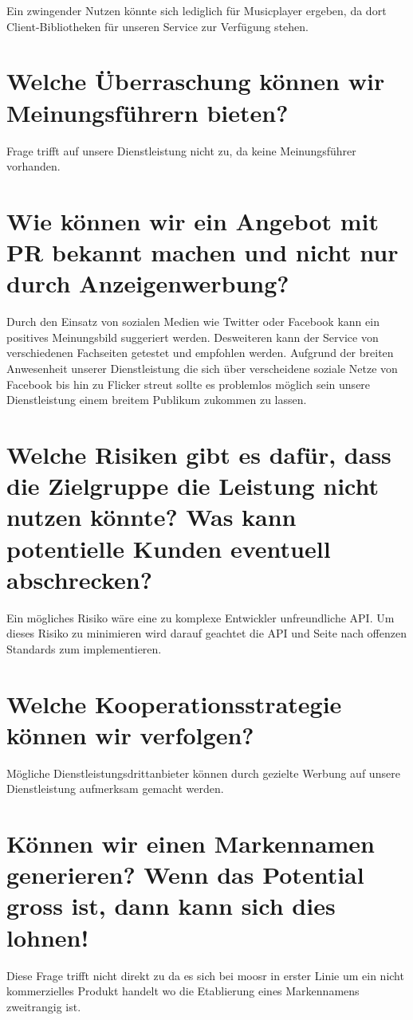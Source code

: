 \documentclass[11pt]{scrreprt}
\begin{document}
Ein zwingender Nutzen könnte sich lediglich für Musicplayer ergeben, da dort 
Client-Bibliotheken für unseren Service zur Verfügung stehen. 

\section{Welche Überraschung können wir
Meinungsführern bieten?}
Frage trifft auf unsere Dienstleistung nicht zu, da keine Meinungsführer
vorhanden.


\section{Wie können wir ein Angebot mit PR bekannt
    machen und nicht nur durch
Anzeigenwerbung?}

Durch den Einsatz von sozialen Medien wie Twitter oder Facebook kann ein
positives Meinungsbild suggeriert werden. Desweiteren kann der Service von
verschiedenen Fachseiten getestet und empfohlen werden. Aufgrund der breiten
Anwesenheit unserer Dienstleistung die sich über verscheidene soziale Netze
von Facebook bis hin zu Flicker streut sollte es problemlos möglich sein unsere
Dienstleistung einem breitem Publikum zukommen zu lassen.


\section{Welche Risiken gibt es dafür, dass die Zielgruppe
    die Leistung nicht nutzen könnte?
    Was kann potentielle Kunden eventuell
abschrecken?}
Ein mögliches Risiko wäre eine zu komplexe Entwickler unfreundliche API. Um
dieses Risiko zu minimieren wird darauf geachtet die API und Seite nach offenzen
Standards zum implementieren.

\section{Welche Kooperationsstrategie können wir
verfolgen?}
Mögliche Dienstleistungsdrittanbieter können durch gezielte Werbung auf unsere 
Dienstleistung aufmerksam gemacht werden.


\label{Markenname}\section{Können wir einen Markennamen generieren?
    Wenn das Potential gross ist, dann kann sich
dies lohnen!}
Diese Frage trifft nicht direkt zu da es sich bei moosr in erster Linie um ein
nicht kommerzielles Produkt handelt wo die Etablierung eines Markennamens
zweitrangig ist. 
\end{document}

